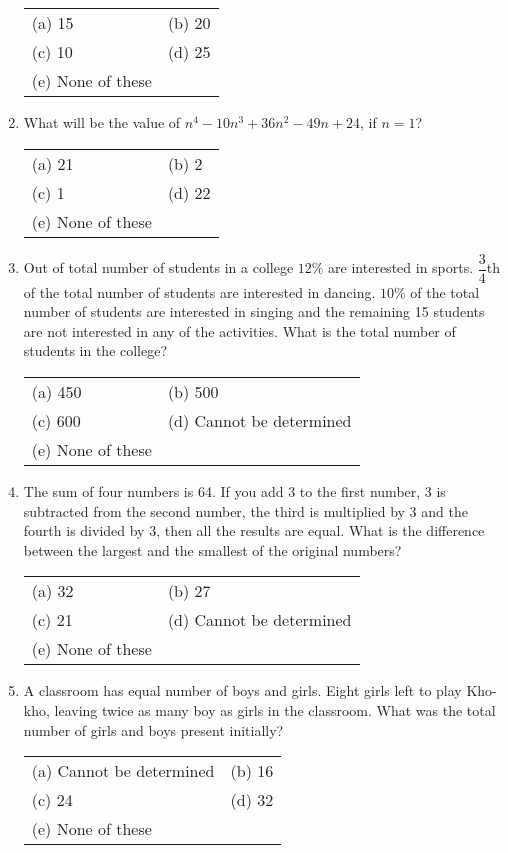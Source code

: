 \begin{multicols}{2}
\begin{enumerate}[leftmargin=*]
\begin{tabular}{l@{\qquad\quad}l}
(a) 15 & (b) 20 \\
(c) 10 & (d) 25 \\
(e) None of these
\end{tabular}

\item What will be the value of $n^4 - 10n^3 + 36n^2 - 49n + 24$, if $n = 1$?

\begin{tabular}{l@{\qquad\quad}l}
(a) 21 & (b) 2 \\
(c) 1  & (d) 22 \\
(e) None of these
\end{tabular}

\item Out of total number of students in a college $12\%$ are interested in sports. $\dfrac{3}{4}$th of the total number of students are interested in dancing. $10\%$ of the total number of students are interested in singing and the remaining 15 students are not interested in any of the activities. What is the total number of students in the college?

\begin{tabular}{l@{\qquad\quad}l}
(a) 450 & (b) 500 \\
(c) 600 & (d) Cannot be determined \\
(e) None of these
\end{tabular}

\item The sum of four numbers is 64. If you add 3 to the first number, 3 is subtracted from the second number, the third is multiplied by 3 and the fourth is divided by 3, then all the results are equal. What is the difference between the largest and the smallest of the original numbers?

\begin{tabular}{l@{\qquad\quad}l}
(a) 32 & (b) 27 \\
(c) 21 & (d) Cannot be determined \\
(e) None of these
\end{tabular}

\item A classroom has equal number of boys and girls. Eight girls left to play Kho-kho, leaving twice as many boy as girls in the classroom. What was the total number of girls and boys present initially?

\begin{tabular}{l@{\qquad\quad}l}
(a) Cannot be determined & (b) 16 \\
(c) 24 & (d) 32 \\
(e) None of these
\end{tabular}


\end{enumerate}
\end{multicols}
